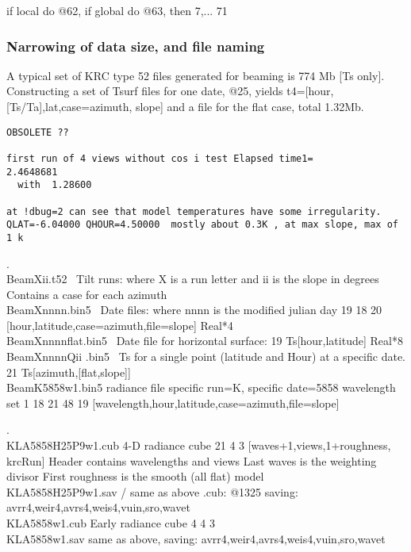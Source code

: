 \documentclass{article}
\begin{document}
 if local do @62, if global do @63, then 7,... 71

\subsubsection{Narrowing of data size, and file naming}
A typical set of KRC type 52 files generated for beaming is 774 Mb [Ts
  only]. Constructing a set of Tsurf files for one date, @25, yields
t4=[hour,[Ts/Ta],lat,case=azimuth, slope] and a file for the flat case, total
1.32Mb. 
 
\begin{verbatim}
OBSOLETE ??

first run of 4 views without cos i test Elapsed time1=        2.4648681
  with  1.28600

at !dbug=2 can see that model temperatures have some irregularity.
QLAT=-6.04000 QHOUR=4.50000  mostly about 0.3K , at max slope, max of 1 k
\end{verbatim}

.
\\ BeamXii.t52 \ Tilt runs: where X is a run letter and ii is the slope in degrees
\qi Contains a case for each azimuth
\\ BeamXnnnn.bin5 \ Date files: where nnnn is the modified julian day
 19 18 20  [hour,latitude,case=azimuth,file=slope]  Real*4
\\ BeamXnnnnflat.bin5  \ Date file for horizontal surface:
 19 Ts[hour,latitude]   Real*8
\\ BeamXnnnnQii .bin5  \ Ts for a single point (latitude and Hour) at a specific date.
 21 Ts[azimuth,[flat,slope]]
\\ BeamK5858w1.bin5 radiance file specific run=K, specific date=5858 wavelength set 1
 18 21 48 19 [wavelength,hour,latitude,case=azimuth,file=slope]

\vspace{2mm} .
\\ KLA5858H25P9w1.cub   4-D radiance cube
 21 4 3  [waves+1,views,1+roughness, krcRun]
\qiii Header contains wavelengths and views
\qii Last waves is the weighting divisor
\qii First roughness is the smooth (all flat) model
\\ KLA5858H25P9w1.sav  /  same as above .cub:  @1325
\qi saving:  avrr4,weir4,avrs4,weis4,vuin,sro,wavet
\\ KLA5858w1.cub   Early radiance cube
 4 4 3
\\ KLA5858w1.sav 
\qi same as above, saving:  avrr4,weir4,avrs4,weis4,vuin,sro,wavet
\end{document}
